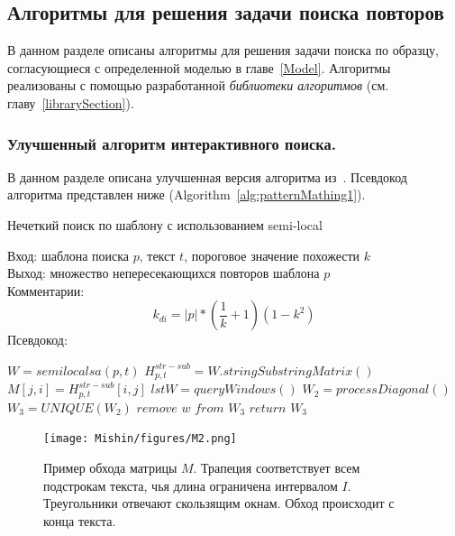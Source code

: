 \subsection{Алгоритмы для решения задачи поиска повторов}\label{fics}

В данном разделе описаны алгоритмы для решения задачи поиска по образцу,  согласующиеся с определенной моделью в главе~\ref{Model}.
Алгоритмы реализованы с помощью разработанной \emph{библиотеки алгоритмов} (см. главу~\ref{librarySection}).

\subsubsection{Улучшенный алгоритм интерактивного поиска.}
В данном разделе описана улучшенная версия алгоритма из~\cite{luciv2019interactive}.
Псевдокод алгоритма представлен ниже (Algorithm~\ref{alg:patternMathing1}).

\begin{algorithm}[t!]
\caption{Нечеткий поиск по шаблону с использованием semi-local}\label{alg:patternMathing1}
Вход: шаблона поиска $p$, текст $t$, пороговое значение похожести $k$\\
Выход: множество непересекающихся повторов шаблона $p$\\
Комментарии:
\begin{equation}
    k_{di}=|p|*(\frac{1}{k}+1)(1-k^2)
\end{equation}
Псевдокод:
\begin{algorithmic}[1]
\State $W = semilocalsa(p,t)$
\State $ H^{str-sub}_{p,t} =  W.stringSubstringMatrix()$
\State $ M[j,i] = H^{str-sub}_{p,t}[i,j] $
\State $lstW = queryWindows()$
\State $W_2 = processDiagonal()$
\State $W_3 = UNIQUE(W_2)$
\State $remove$ $w$ $from$ $W_3$
\EndIf
\EndFor
\State $return$ $W_3$

\end{algorithmic}
\end{algorithm}

\begin{figure}[t!]
\centering
    \texttt{[image: Mishin/figures/M2.png]}
    \caption{Пример обхода матрицы $M$. Трапеция соответствует всем подстрокам текста, чья длина ограничена интервалом $I$. Треугольники отвечают скользящим окнам.
    Обход происходит с конца текста.
    }\label{passage}
\end{figure}

